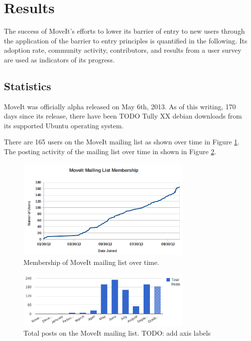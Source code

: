 \documentclass[10pt,journal,compsoc]{joser1}
\begin{document}
{%
\section{Results}
\label{sec::results}

The success of MoveIt's efforts to lower its barrier of entry to new users through the application of the barrier to entry principles is quantified in the following. Its adoption rate, community activity, contributors, and results from a user survey are used as indicators of its progress.

\subsection{Statistics}
\label{sec::statistics}

MoveIt was officially alpha released on May 6th, 2013. As of this writing, 170 days since its release, there have been TODO Tully XX debian downloads from its supported Ubuntu operating system.

There are 165 users on the MoveIt mailing list as shown over time in Figure \ref{fig:membership_plot}. The posting activity of the mailing list over time in shown in Figure \ref{fig:mailing_list}.

\begin{figure}[!t]
\centering
\includegraphics[width=3.4in]{images/membership_plot}
\caption{Membership of MoveIt mailing list over time.}
\label{fig:membership_plot}
\end{figure}

\begin{figure}[!t]
\centering
\includegraphics[width=3.4in]{images/mailing_list}
\caption{Total posts on the MoveIt mailing list. TODO: add axis labels}
\label{fig:mailing_list}
\end{figure}

}
\end{document}

